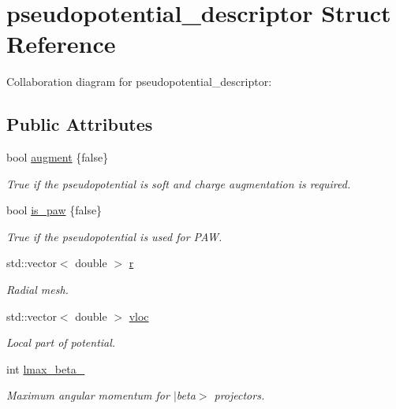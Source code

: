 \hypertarget{structpseudopotential__descriptor}{}\section{pseudopotential\+\_\+descriptor Struct Reference}
\label{structpseudopotential__descriptor}


Collaboration diagram for pseudopotential\+\_\+descriptor\+:
\subsection*{Public Attributes}
\begin{DoxyCompactItemize}
\item 
bool \hyperlink{structpseudopotential__descriptor_a924706ceb283fbae59e46fb0ff947054}{augment} \{false\}
\begin{DoxyCompactList}\small\item\em True if the pseudopotential is soft and charge augmentation is required. \end{DoxyCompactList}\item 
bool \hyperlink{structpseudopotential__descriptor_a4f218335e6684e55cffb46f33d6ff472}{is\+\_\+paw} \{false\}
\begin{DoxyCompactList}\small\item\em True if the pseudopotential is used for P\+A\+W. \end{DoxyCompactList}\item 
std\+::vector$<$ double $>$ \hyperlink{structpseudopotential__descriptor_a87d69029e9864672d1a5e45ecc3fc5b2}{r}
\begin{DoxyCompactList}\small\item\em Radial mesh. \end{DoxyCompactList}\item 
std\+::vector$<$ double $>$ \hyperlink{structpseudopotential__descriptor_a32f0a72237d6c04f33b63b5811352892}{vloc}
\begin{DoxyCompactList}\small\item\em Local part of potential. \end{DoxyCompactList}\item 
int \hyperlink{structpseudopotential__descriptor_ae4237a6921e6d375f23aedf4c8d523bd}{lmax\+\_\+beta\+\_\+}
\begin{DoxyCompactList}\small\item\em Maximum angular momentum for $\vert$beta$>$ projectors. \end{DoxyCompactList}\item 

\end{DoxyCompactItemize}
